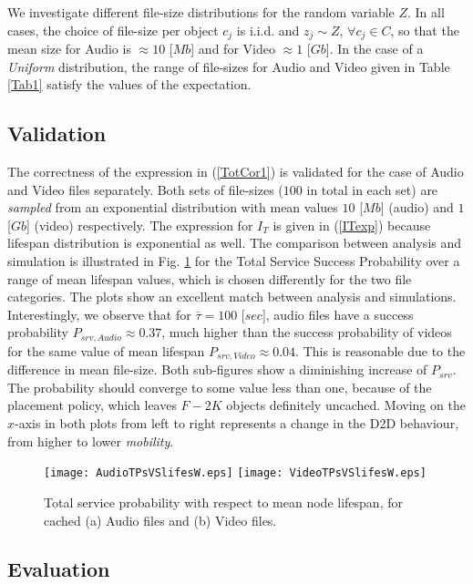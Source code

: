 \documentclass[conference]{IEEEtran}
\begin{document}
We investigate different file-size distributions for the random variable $Z$. In all cases, the choice of file-size per object $c_j$ is i.i.d. and $z_j\sim Z$, $\forall c_j\in C$, so that the mean size for Audio is $\approx 10$ [$Mb$] and for Video $\approx 1$ [$Gb$]. In the case of a \textit{Uniform} distribution, the range of file-sizes for Audio and Video given in Table \ref{Tab1} satisfy the values of the expectation.


\subsection{Validation}

The correctness of the expression in (\ref{TotCor1}) is validated for the case of Audio and Video files separately. Both sets of file-sizes ($100$ in total in each set) are \textit{sampled} from an exponential distribution with mean values $10$ [$Mb$] (audio) and $1$ [$Gb$] (video) respectively. The expression for $I_T$ is given in (\ref{ITexp}) because lifespan distribution is exponential as well. The comparison between analysis and simulation is illustrated in Fig. \ref{fig:valid} for the Total Service Success Probability over a range of mean lifespan values, which is chosen differently for the two file categories. The plots show an excellent match between analysis and simulations. Interestingly, we observe that for $\bar{\tau}=100$ [$sec$], audio files have a success probability $P_{srv,Audio} \approx 0.37$, much higher than the success probability of videos for the same value of mean lifespan $P_{srv,Video} \approx 0.04$. This is reasonable due to the difference in mean file-size. Both sub-figures show a diminishing increase of $P_{srv}$. The probability should converge to some value less than one, because of the placement policy, which leaves $F-2K$ objects definitely uncached. Moving on the $x$-axis in both plots from left to right represents a change in the D2D behaviour, from higher to lower \textit{mobility}.
\begin{figure}[ht!]
\centering
\texttt{[image: AudioTPsVSlifesW.eps]}
\texttt{[image: VideoTPsVSlifesW.eps]}
\caption{Total service probability with respect to mean node lifespan, for cached (a) Audio files and (b) Video files.}
\label{fig:valid}
\end{figure}


\subsection{Evaluation}
\end{document}
